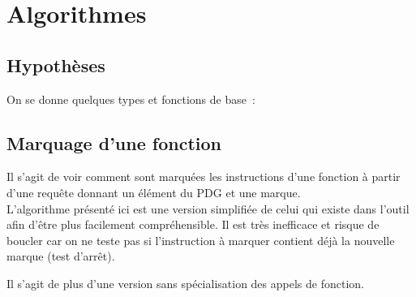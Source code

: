 \chapter{Algorithmes}

\section{Hypothèses}

On se donne quelques types et fonctions de base~:\\


\section{Marquage d'une fonction}\label{sec-algo-mark-fct}

Il s'agit de voir comment sont marquées les instructions d'une fonction
à partir d'une requête donnant un élément du PDG et une marque.\\

L'algorithme présenté ici est une version simplifiée
de celui qui existe dans
l'outil afin d'être plus facilement compréhensible.
Il est très inefficace et risque de boucler car on ne teste pas
si l'instruction à marquer contient déjà la nouvelle marque (test d'arrêt).

Il s'agit de plus d'une version sans spécialisation des appels de fonction.\\

